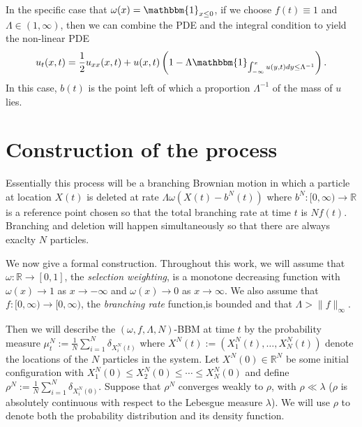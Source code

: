 \documentclass[10pt,a4paper]{amsart}
\newcommand{\B}[1]{\mathbb{#1}}
\newcommand{\is}{\mathbbm{1}}
\begin{document}
In the specific case that $\omega(x)=\is_{x\leq 0}$, if we choose $f(t)\equiv 1$ and $\Lambda\in (1,\infty)$, then we can combine the PDE and the integral condition to yield the non-linear PDE
\begin{align*}
    u_t(x,t)=\frac12 u_{xx}(x,t)+u(x,t)\left(1-\Lambda\is_{\int_{-\infty}^x u(y,t)dy \leq \Lambda^{-1}}\right).
\end{align*}
In this case, $b(t)$ is the point left of which a proportion $\Lambda^{-1}$ of the mass of $u$ lies. %

\section{Construction of the process}\label{constructionSec}

Essentially this process will be a branching Brownian motion in which a particle at location $X(t)$ is deleted at rate $\Lambda\omega(X(t)-b^N(t))$ where $b^N:[0,\infty)\to \B{R}$ is a reference point chosen so that the total branching rate at time $t$ is $Nf(t)$. Branching and deletion will happen simultaneously so that there are always exaclty $N$ particles. 

We now give a formal construction. Throughout this work, we will assume that $\omega:\B{R}\to [0,1]$, the \textit{selection weighting}, is a monotone decreasing function with $\omega(x)\to 1$ as $x\to-\infty$ and $\omega(x)\to 0$ as $x\to\infty$. We also assume that $f:[0,\infty)\to [0,\infty)$, the \textit{branching rate} function,is bounded and that $\Lambda > \|f\|_\infty$. 

Then we will describe the $(\omega,f,\Lambda,N)$-BBM at time $t$ by the probability measure $\mu_t^N:=\frac1N\sum_{i=1}^N \delta_{X_i^N(t)}$ where $X^N(t):=(X_1^N(t),\ldots,X_N^N(t))$ denote the locations of the $N$ particles in the system. Let $X^N(0)\in \B{R}^N$ be some initial configuration with $X_1^N(0)\leq X_2^N(0)\leq \cdots\leq X^N_N(0)$ and define $\rho^N:=\frac1N\sum_{i=1}^N \delta_{X^N_i(0)}$. Suppose that $\rho^N$ converges weakly to $\rho$, with $\rho\ll\lambda$ ($\rho$ is absolutely continuous with respect to the Lebesgue measure $\lambda$). We will use $\rho$ to denote both the probability distribution and its density function.
\end{document}

